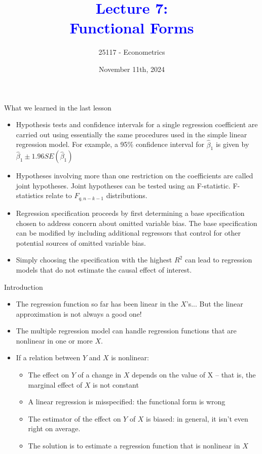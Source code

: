 \documentclass[notes,10pt, aspectratio=169]{beamer}
\title[]{\textcolor{blue}{Lecture 7:\\Functional Forms}}
\author{25117 - Econometrics}
\institute[shortinst]{Universitat Pompeu Fabra}
\date{November 11th, 2024}
\begin{document}
\begin{frame}[plain]
\maketitle
\end{frame}


\begin{frame}{What we learned in the last lesson}
\begin{itemize}
    \item Hypothesis tests and confidence intervals for a single regression coefficient are carried out using essentially the same procedures used in the simple linear regression model. For example, a 95\% confidence interval for $\hat{\beta}_1$ is given by $\hat{\beta}_1\pm 1.96 SE(\hat{\beta}_1)$\\[1em]
    \item Hypotheses involving more than one restriction on the coefficients are called joint hypotheses. Joint hypotheses can be tested using an F-statistic. F-statistics relate to $F_{q,n-k-1}$ distributions. \\[1em]
    \item Regression specification proceeds by first determining a base specification chosen to address concern about omitted variable bias. The base specification can be modified by including additional regressors that control for other potential sources of omitted variable bias.\\[1em]
    \item Simply choosing the specification with the highest $R^2$ can lead to regression models that do not estimate the causal effect of interest.
\end{itemize}
\end{frame}

\begin{frame}{Introduction}
\begin{itemize}
    \item The regression function so far has been linear in the $X$’s... But the linear approximation is not always a good one!\\[1em]
    \item The multiple regression model can handle regression functions that are nonlinear in one or more $X$.\\[1em]
    \item If a relation between $Y$ and $X$ is nonlinear:
    \begin{itemize}
        \item The effect on $Y$ of a change in $X$ depends on the value of   X – that is, the marginal effect of $X$ is not constant
        \item A linear regression is misspecified: the functional form is wrong
        \item The estimator of the effect on $Y$ of $X$ is biased: in general, it isn’t even right on average.
        \item The solution is to estimate a regression function that is nonlinear in $X$
    \end{itemize}
\end{itemize}
\end{frame}
\end{document}
